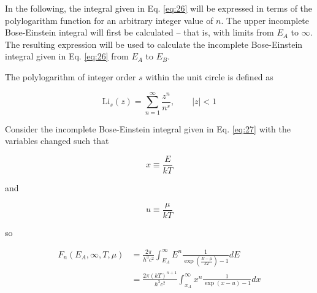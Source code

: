 \documentclass[letterpaper,12pt]{article}
\newcommand{\Li}{\textrm{Li}}
\begin{document}



In the following, the integral given in Eq. \ref{eq:26} will be expressed in terms of the polylogarithm function for an arbitrary integer value of $n$. The upper incomplete Bose-Einstein integral will first be calculated -- that is, with limits from $E_{A}$ to $\infty$. The resulting expression will be used to calculate the incomplete Bose-Einstein integral given in Eq. \ref{eq:26} from $E_{A}$ to $E_{B}$.

The polylogarithm of integer order $s$ within the unit circle is defined as

\begin{equation} \label{eq:22}
\Li_{s}(z) = \sum_{n = 1}^{\infty} \frac{z^{n}}{n^{s}}, \qquad |z| < 1
\end{equation}

Consider the incomplete Bose-Einstein integral given in Eq. \ref{eq:27} with the variables changed such that

\begin{equation} \label{eq:28}
x \equiv \frac{E}{kT}
\end{equation}

\noindent and

\begin{equation} \label{eq:29}
u \equiv \frac{\mu}{kT}
\end{equation}

\noindent so

\begin{align} \label{eq:27}
F_{n}(E_{A},\infty,T,\mu) &= \frac{2 \pi}{h^{3}c^{2}} \int_{E_{A}}^{\infty} E^{n} \frac{1}{\exp \left( \frac{E - \mu}{kT} \right) - 1} dE \nonumber \\
 &= \frac{2 \pi (kT)^{n+1}}{h^{3}c^{2}} \int_{x_{A}}^{\infty} x^{n} \frac{1}{\exp(x-u) - 1} dx
\end{align}
\end{document}

